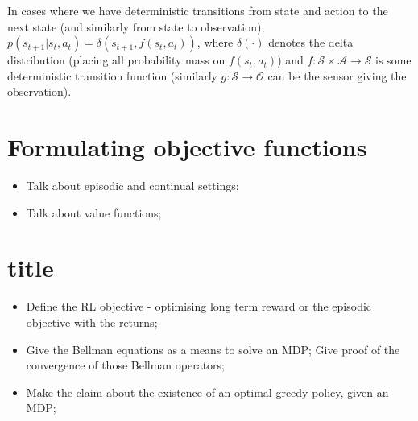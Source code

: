 \documentclass{report}
\numberwithin{equation}{section}
\numberwithin{figure}{section}
\numberwithin{table}{section}
\begin{document}
In cases where we have deterministic transitions from state and action 
to the next state (and similarly from state to observation), 
$p(s_{t+1}|s_t, a_t)=\delta(s_{t+1},f(s_t, a_t))$, where 
$\delta(\cdot)$ denotes the delta distribution (placing all 
probability mass on $f(s_t, a_t)$) and 
$f: \mathcal{S}\times\mathcal{A}\rightarrow \mathcal{S}$ is some deterministic 
transition function (similarly $g:\mathcal{S}\rightarrow \mathcal{O}$ 
can be the sensor giving the observation).

\section{Formulating objective functions}
\label{sec:RLObjectives}
\begin{itemize}
  \item Talk about episodic and continual settings;
  \item Talk about value functions;
\end{itemize}

\section{title}



\begin{itemize}
  \item Define the RL objective - optimising long term reward 
    or the episodic objective with the returns;
  \item Give the Bellman equations as a means to solve an MDP;
    Give proof of the convergence of those Bellman operators;
  \item Make the claim about the existence of an optimal greedy 
    policy, given an MDP;
\end{itemize}

\end{document}
